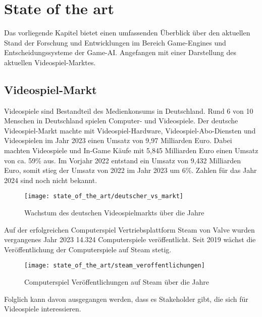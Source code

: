 \chapter{State of the art}
\label{chap:sota}

Das vorliegende Kapitel bietet einen umfassenden Überblick über den aktuellen Stand der Forschung und Entwicklungen im Bereich Game-Engines und Entscheidungssysteme der Game-AI. Angefangen mit einer Darstellung des aktuellen Videospiel-Marktes.

\section{Videospiel-Markt}
\label{chap: sota videospielmarkt}

Videospiele sind Bestandteil des Medienkonsums in Deutschland. Rund 6 von 10 Menschen in Deutschland spielen Computer- und Videospiele. Der deutsche Videospiel-Markt machte mit Videospiel-Hardware, Videospiel-Abo-Diensten und Videospielen im Jahr 2023 einen Umsatz von 9,97 Milliarden Euro. Dabei machten Videospiele und In-Game K\"{a}ufe mit 5,845 Milliarden Euro einen Umsatz von ca. 59\% aus. Im Vorjahr 2022 entstand ein Umsatz von 9,432 Milliarden Euro, somit stieg der Umsatz von 2022 im Jahr 2023 um 6\%.  Zahlen f\"{u}r das Jahr 2024 sind noch nicht bekannt.

\begin{figure}[h]
  \centering
  \texttt{[image: state\_of\_the\_art/deutscher\_vs\_markt]}
	\captionsetup{justification=justified, format=plain}
  \caption{Wachstum des deutschen Videospielmarkts \"{u}ber die Jahre}
  \label{Deutscher Videospielmarkt}
\end{figure}

Auf der erfolgreichen Computerspiel Vertriebsplattform Steam von Valve wurden vergangenes Jahr 2023 14.324 Computerspiele ver\"{o}ffentlicht. Seit 2019 w\"{a}chst die Ver\"{o}ffentlichung der Computerspiele auf Steam stetig.

\begin{figure}[h]
  \centering
  \texttt{[image: state\_of\_the\_art/steam\_veroffentlichungen]}
	\captionsetup{justification=justified, format=plain}
  \caption{Computerspiel Ver\"{o}ffentlichungen auf Steam \"{u}ber die Jahre}
  \label{fig:steamdb}
\end{figure}

Folglich kann davon ausgegangen werden, dass es Stakeholder gibt, die sich f\"{u}r Videospiele interessieren.




